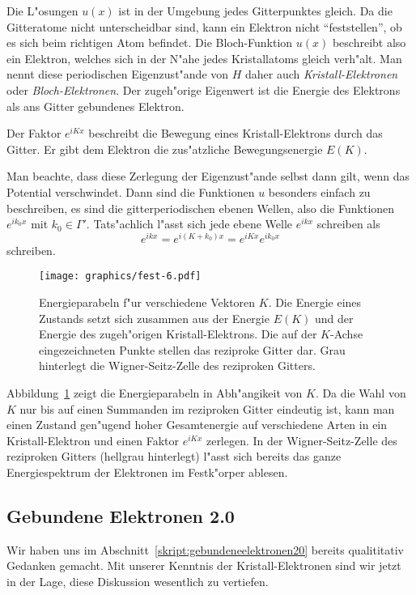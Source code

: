 Die L"osungen $u(x)$ ist in der Umgebung jedes Gitterpunktes gleich.
Da die Gitteratome nicht unterscheidbar sind, kann ein Elektron
nicht ``feststellen'', ob es sich beim richtigen Atom befindet.
Die Bloch-Funktion $u(x)$ beschreibt also ein Elektron,
welches sich in der N"ahe jedes Kristallatoms gleich verh"alt.
Man nennt diese periodischen Eigenzust"ande von $H$ daher auch
{\em Kristall-Elektronen}
oder
{\em Bloch-Elektronen}.
%
%
Der zugeh"orige Eigenwert ist die Energie des Elektrons als ans Gitter
gebundenes Elektron.

Der Faktor $e^{iKx}$ beschreibt die Bewegung eines Kristall-Elektrons
durch das Gitter. Er gibt dem Elektron die zus"atzliche Bewegungsenergie
$E(K)$.

Man beachte, dass diese Zerlegung der Eigenzust"ande selbst dann gilt,
wenn das Potential verschwindet.
Dann sind die Funktionen $u$ besonders einfach zu beschreiben, es
sind die gitterperiodischen ebenen Wellen, also die Funktionen $e^{ik_0x}$ mit
$k_0\in\Gamma'$.
Tats"achlich l"asst sich jede ebene Welle $e^{ikx}$ schreiben als
\[
e^{ikx}=e^{i(K+k_0)x} = e^{iKx}e^{ik_0x}
\]
schreiben.

\begin{figure}
\centering
\texttt{[image: graphics/fest-6.pdf]}
\caption{Energieparabeln f"ur verschiedene Vektoren $K$. Die Energie
eines Zustands setzt sich zusammen aus der Energie $E(K)$ und der
Energie des zugeh"origen Kristall-Elektrons.
Die auf der $K$-Achse eingezeichneten Punkte stellen das reziproke
Gitter dar.
Grau hinterlegt die Wigner-Seitz-Zelle des reziproken Gitters.
\label{skript:dispersion}}
\end{figure}

Abbildung~\ref{skript:dispersion} zeigt die Energieparabeln in Abh"angikeit
von $K$. Da die Wahl von $K$ nur bis auf einen Summanden im reziproken
Gitter eindeutig ist, kann man einen Zustand gen"ugend hoher Gesamtenergie
auf verschiedene Arten in ein Kristall-Elektron und einen Faktor 
$e^{iKx}$ zerlegen.
In der Wigner-Seitz-Zelle des reziproken Gitters (hellgrau hinterlegt)
l"asst sich bereits
das ganze Energiespektrum der Elektronen im Festk"orper ablesen.

\subsection{Gebundene Elektronen 2.0\label{skript:gebundeneelektronen20}}
Wir haben uns im Abschnitt~\ref{skript:gebundeneelektronen20} bereits 
qualititativ Gedanken gemacht.
Mit unserer Kenntnis der Kristall-Elektronen sind wir jetzt in der Lage,
diese Diskussion wesentlich zu vertiefen.

